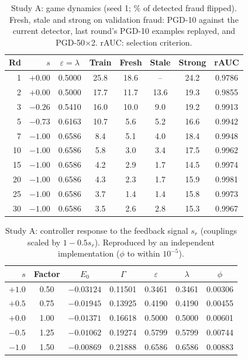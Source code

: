 \documentclass[conference]{IEEEtran}
\begin{document}
\begin{table}[t]
\centering
\caption{Study A: game dynamics (seed 1; \% of detected fraud flipped). Fresh, stale and strong on validation fraud: PGD-10 against the current detector, last round's PGD-10 examples replayed, and PGD-50$\times$2. rAUC: selection criterion.}
\label{tab:dyn}
\footnotesize
\setlength{\tabcolsep}{3pt}
\begin{tabular}{rrcccccc}
\toprule
Rd & $s$ & $\varepsilon{=}\lambda$ & Train & Fresh & Stale & Strong & rAUC\\
\midrule
1 & $+0.00$ & 0.5000 & 25.8 & 18.6 & -- & 24.2 & 0.9786\\
2 & $+0.00$ & 0.5000 & 17.7 & 11.7 & 13.6 & 19.3 & 0.9855\\
3 & $-0.26$ & 0.5410 & 16.0 & 10.0 & 9.0 & 19.2 & 0.9913\\
5 & $-0.73$ & 0.6163 & 10.7 & 5.6 & 5.2 & 16.6 & 0.9942\\
7 & $-1.00$ & 0.6586 & 8.4 & 5.1 & 4.0 & 18.4 & 0.9948\\
10 & $-1.00$ & 0.6586 & 5.8 & 3.0 & 3.4 & 17.5 & 0.9962\\
15 & $-1.00$ & 0.6586 & 4.2 & 2.9 & 1.7 & 14.5 & 0.9974\\
20 & $-1.00$ & 0.6586 & 4.3 & 2.3 & 1.7 & 15.9 & 0.9981\\
25 & $-1.00$ & 0.6586 & 3.7 & 1.4 & 1.4 & 15.8 & 0.9973\\
30 & $-1.00$ & 0.6586 & 3.5 & 2.6 & 2.8 & 15.3 & 0.9967\\
\bottomrule
\end{tabular}
\end{table}

\begin{table}[t]
\centering
\caption{Study A: controller response to the feedback signal $s_r$ (couplings scaled by $1-0.5s_r$). Reproduced by an independent implementation ($\phi$ to within $10^{-5}$).}
\label{tab:ctrl}
\footnotesize
\setlength{\tabcolsep}{3.5pt}
\begin{tabular}{rcccccc}
\toprule
$s$ & Factor & $E_0$ & $\Gamma$ & $\varepsilon$ & $\lambda$ & $\phi$\\
\midrule
$+1.0$ & 0.50 & $-0.03124$ & 0.11501 & 0.3461 & 0.3461 & 0.00306\\
$+0.5$ & 0.75 & $-0.01945$ & 0.13925 & 0.4190 & 0.4190 & 0.00455\\
$+0.0$ & 1.00 & $-0.01371$ & 0.16618 & 0.5000 & 0.5000 & 0.00601\\
$-0.5$ & 1.25 & $-0.01062$ & 0.19274 & 0.5799 & 0.5799 & 0.00744\\
$-1.0$ & 1.50 & $-0.00869$ & 0.21888 & 0.6586 & 0.6586 & 0.00883\\
\bottomrule
\end{tabular}
\end{table}
\end{document}
